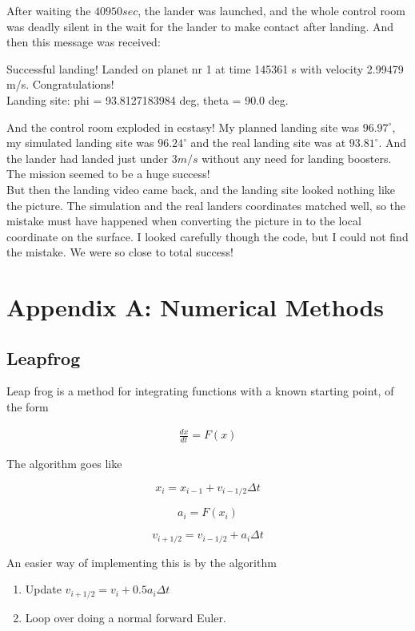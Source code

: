 \documentclass[a4paper, 10pt]{article}
\begin{document}
After waiting the $40950 sec$, the lander was launched, and the whole control room was deadly silent in the wait for the lander to make contact after landing. And then this message was received:

\begin{tcolorbox}
Successful landing! Landed on planet nr 1 at time 145361 s with velocity 2.99479 m/s. Congratulations! \\
Landing site: phi =  93.8127183984 deg,  theta =  90.0 deg.
\end{tcolorbox}

And the control room exploded in ecstasy! My planned landing site was $96.97^\circ$, my simulated landing site was $96.24^\circ$ and the real landing site was at $93.81^\circ$. And the lander had landed just under $3 m/s$ without any need for landing boosters. The mission seemed to be a huge success! \\

But then the landing video came back, and the landing site looked nothing like the picture. The simulation and the real landers coordinates matched well, so the mistake must have happened when converting the picture in to the local coordinate on the surface. I looked carefully though the code, but I could not find the mistake. We were so close to total success!  



\section{Appendix A: Numerical Methods}
\subsection{Leapfrog}\label{sec:leap}

Leap frog is a method for integrating functions with a known starting point, of the form \cite{leap} 

\begin{align}
\frac{dx}{dt} = F(x)
\end{align}

The algorithm goes like

$$
x_i = x_{i-1} + v_{i-1/2}\Delta t
$$

$$
a_i = F(x_i)
$$

$$
v_{i+1/2} = v_{i-1/2} + a_i \Delta t
$$

An easier way of implementing this is by the algorithm

\begin{enumerate}
\item Update $v_{i+1/2} = v_{i} + 0.5a_i \Delta t$
\item Loop over doing a normal forward Euler.
\end{enumerate}
\end{document}
